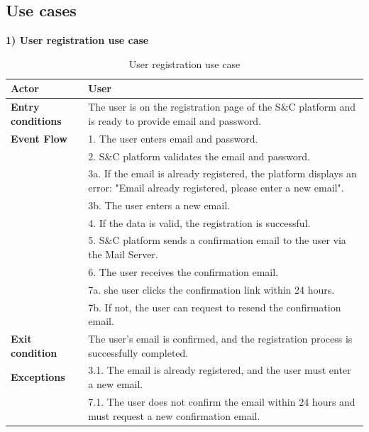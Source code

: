 \subsection{Use cases} 
\textbf{1) User registration use case}\\
\begin{table}[h!]
    \centering
    \begin{tabular}{lp{10cm}}
        \textbf{Actor} & User \\ \hline
        \textbf{Entry conditions} & The user is on the registration page of the S\&C platform and is ready to provide email and password. \\ \hline
        \textbf{Event Flow} & 
       1. The user enters email and password. \\
        & 2. S\&C platform validates the email and password. \\
        & 3a. If the email is already registered, the platform displays an error: "Email already registered, please enter a new email". \\
        & 3b. The user enters a new email. \\
        & 4. If the data is valid, the registration is successful. \\
        & 5. S\&C platform sends a confirmation email to the user via the Mail Server. \\
        & 6. The user receives the confirmation email. \\
        & 7a. she user clicks the confirmation link within 24 hours. \\
        & 7b. If not, the user can request to resend the confirmation email. \\
        \hline
        \textbf{Exit condition} & The user's email is confirmed, and the registration process is successfully completed. \\ \hline
        \textbf{Exceptions} & 
        3.1. The email is already registered, and the user must enter a new email. \\
        & 7.1. The user does not confirm the email within 24 hours and must request a new confirmation email. \\
    \end{tabular}
    \caption{User registration use case}
    \label{tab:user_registration}
\end{table}

